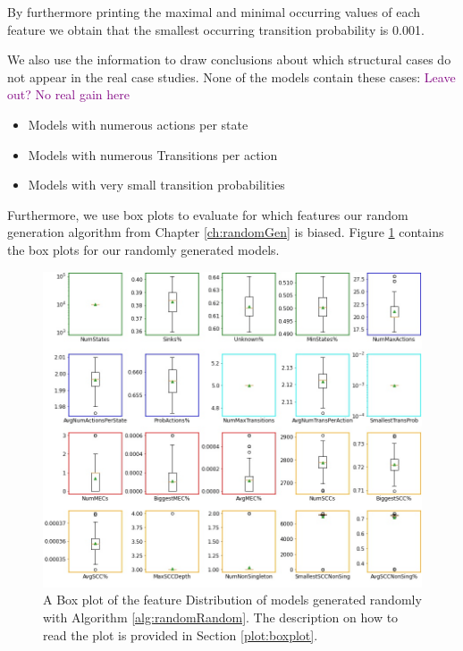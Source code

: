 By furthermore printing the maximal and minimal occurring values of each feature we obtain that the smallest occurring transition probability is 0.001.

We also use the information to draw conclusions about which structural cases do not appear in the real case studies. 
None of the models contain these cases: \textcolor{purple}{Leave out? No real gain here}
\begin{itemize}
    \item Models with numerous actions per state
    \item Models with numerous Transitions per action
    \item Models with very small transition probabilities
\end{itemize}
\FloatBarrier
Furthermore, we use box plots to evaluate for which features our random generation algorithm from Chapter \ref{ch:randomGen} is biased.
Figure \ref{fig:Random_FeatureDistribution} contains the box plots for our randomly generated models.
\begin{figure}[h!]
    \centering
    \includegraphics[width=1\textwidth]{figures/RandomRandom_FeatureDistribution.jpg}
    \caption[Feature Distribution of random models]{
        A Box plot of the feature Distribution of models generated randomly with Algorithm \ref{alg:randomRandom}. The description on how to read the plot is provided in Section \ref{plot:boxplot}.
    }
    \label{fig:Random_FeatureDistribution}
\end{figure}
\FloatBarrier

